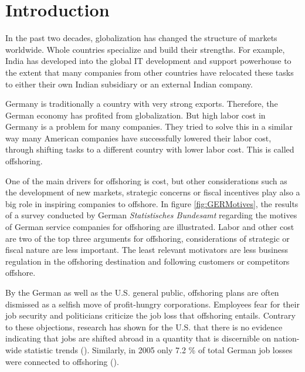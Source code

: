 \section{Introduction}
In the past two decades, globalization has changed the structure of markets worldwide. Whole countries specialize and build their strengths. For example, India has developed into the global IT development and support powerhouse to the extent that many companies from other countries have relocated these tasks to either their own Indian subsidiary or an external Indian company.

Germany is traditionally a country with very strong exports. Therefore, the German economy has profited from globalization. But high labor cost in Germany is a problem for many companies. They tried to solve this in a similar way many American companies have successfully lowered their labor cost, through shifting tasks to a different country with lower labor cost. This is called offshoring.

One of the main drivers for offshoring is cost, but other considerations such as the development of new markets, strategic concerns or fiscal incentives play also a big role in inspiring companies to offshore. In figure \ref{fig:GERMotives}, the results of a survey conducted by German \textit{Statistisches Bundesamt} regarding the motives of German service companies for offshoring are illustrated. Labor and other cost are two of the top three arguments for offshoring, considerations of strategic or fiscal nature are less important. The least relevant motivators are less business regulation in the offshoring destination and following customers or competitors offshore.

\vspace{5mm}



By the German as well as the U.S. general public, offshoring plans are often dismissed as a selfish move of profit-hungry corporations. Employees fear for their job security and politicians criticize the job loss that offshoring entails. Contrary to these objections, research has shown for the U.S. that there is no evidence indicating that jobs are shifted abroad in a quantity that is discernible on nation-wide statistic trends (\cite[p. 7]{Jackson.2013}). Similarly, in 2005 only 7.2 \% of total German job losses were connected to offshoring (\cite[p. 30]{Gorg.2011}).

